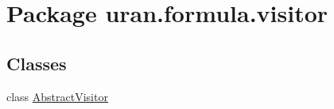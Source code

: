 \hypertarget{namespaceuran_1_1formula_1_1visitor}{}\section{Package uran.\+formula.\+visitor}
\label{namespaceuran_1_1formula_1_1visitor}
\subsection*{Classes}
\begin{DoxyCompactItemize}
\item 
class \hyperlink{classuran_1_1formula_1_1visitor_1_1_abstract_visitor}{Abstract\+Visitor}
\end{DoxyCompactItemize}
